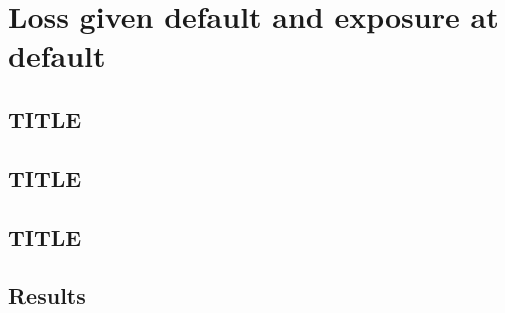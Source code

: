 \chapter{Loss given default and exposure at default}
\label{ch:lgd-ead}


\section{TITLE}
\label{sec:m14}


\section{TITLE}
\label{sec:m15}


\section{TITLE}
\label{sec:m34}


\section{Results}
\label{sec:results-lgd-ead}

